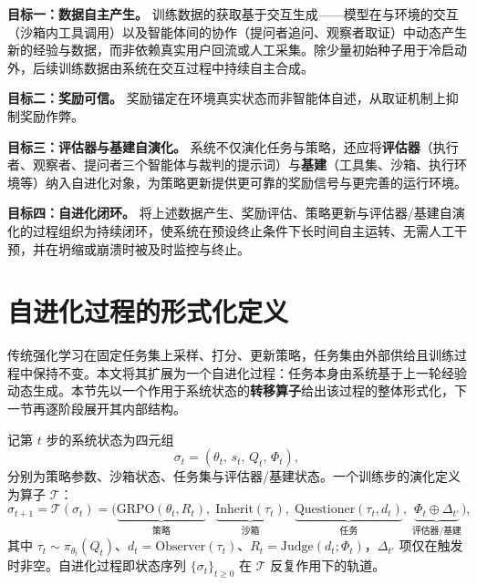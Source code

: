 \textbf{目标一：数据自主产生。} 训练数据的获取基于交互生成——模型在与环境的交互（沙箱内工具调用）以及智能体间的协作（提问者追问、观察者取证）中动态产生新的经验与数据，而非依赖真实用户回流或人工采集。除少量初始种子用于冷启动外，后续训练数据由系统在交互过程中持续自主合成。

\textbf{目标二：奖励可信。} 奖励锚定在环境真实状态而非智能体自述，从取证机制上抑制奖励作弊。

\textbf{目标三：评估器与基建自演化。} 系统不仅演化任务与策略，还应将\textbf{评估器}（执行者、观察者、提问者三个智能体与裁判的提示词）与\textbf{基建}（工具集、沙箱、执行环境等）纳入自进化对象，为策略更新提供更可靠的奖励信号与更完善的运行环境。

\textbf{目标四：自进化闭环。} 将上述数据产生、奖励评估、策略更新与评估器/基建自演化的过程组织为持续闭环，使系统在预设终止条件下长时间自主运转、无需人工干预，并在坍缩或崩溃时被及时监控与终止。

\section{自进化过程的形式化定义}
\label{sec:formal_convergence}

传统强化学习在固定任务集上采样、打分、更新策略，任务集由外部供给且训练过程中保持不变。本文将其扩展为一个自进化过程：任务本身由系统基于上一轮经验动态生成。本节先以一个作用于系统状态的\textbf{转移算子}给出该过程的整体形式化，下一节再逐阶段展开其内部结构。

\begin{definition}[自进化系统状态与转移算子]
\label{def:evolution_operator}
记第 $t$ 步的系统状态为四元组
\begin{equation}
\sigma_t = (\theta_t,\, s_t,\, Q_t,\, \Phi_t),
\label{eq:sysstate}
\end{equation}
分别为策略参数、沙箱状态、任务集与评估器/基建状态。一个训练步的演化定义为算子 $\mathcal{T}$：
\begin{equation}
\sigma_{t+1} = \mathcal{T}(\sigma_t) =
\big(\underbrace{\text{GRPO}(\theta_t, R_t)}_{\text{策略}},\;
\underbrace{\text{Inherit}(\tau_t)}_{\text{沙箱}},\;
\underbrace{\text{Questioner}(\tau_t, d_t)}_{\text{任务}},\;
\underbrace{\Phi_t \oplus \Delta_{t'}}_{\text{评估器/基建}}\big),
\label{eq:transop}
\end{equation}
其中 $\tau_t\!\sim\!\pi_{\theta_t}(Q_t)$、$d_t=\text{Observer}(\tau_t)$、$R_t=\text{Judge}(d_t;\Phi_t)$，$\Delta_{t'}$ 项仅在触发时非空。自进化过程即状态序列 $\{\sigma_t\}_{t\ge 0}$ 在 $\mathcal{T}$ 反复作用下的轨道。
\end{definition}

